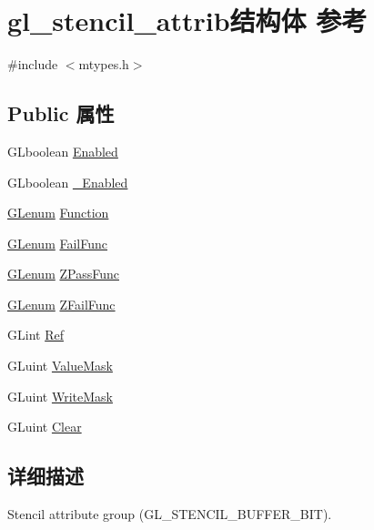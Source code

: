 \hypertarget{structgl__stencil__attrib}{}\section{gl\+\_\+stencil\+\_\+attrib结构体 参考}
\label{structgl__stencil__attrib}


{\ttfamily \#include $<$mtypes.\+h$>$}

\subsection*{Public 属性}
\begin{DoxyCompactItemize}
\item 
G\+Lboolean \hyperlink{structgl__stencil__attrib_a5dd4abe695c8a10181da2b6bcdc14c12}{Enabled}
\item 
G\+Lboolean \hyperlink{structgl__stencil__attrib_aecca45f45121ad46c4bfc823346023ef}{\+\_\+\+Enabled}
\item 
\hyperlink{interfacevoid}{G\+Lenum} \hyperlink{structgl__stencil__attrib_aceda6a4c70c49f4af82bd69c3b037469}{Function}
\item 
\hyperlink{interfacevoid}{G\+Lenum} \hyperlink{structgl__stencil__attrib_a856cbd9279513cc9ffb70d18ee5ecbf4}{Fail\+Func}
\item 
\hyperlink{interfacevoid}{G\+Lenum} \hyperlink{structgl__stencil__attrib_a8e61ca23b8efe111008199eb37bb39b4}{Z\+Pass\+Func}
\item 
\hyperlink{interfacevoid}{G\+Lenum} \hyperlink{structgl__stencil__attrib_aeca1304daecf78e3bc73266b90213ace}{Z\+Fail\+Func}
\item 
G\+Lint \hyperlink{structgl__stencil__attrib_aa1b555431ce8de3795f598fa318ab948}{Ref}
\item 
G\+Luint \hyperlink{structgl__stencil__attrib_a3dcb4134c28d67a86a40023b971f48b6}{Value\+Mask}
\item 
G\+Luint \hyperlink{structgl__stencil__attrib_a1d8e770dacbcb8c3bcc302413065ff34}{Write\+Mask}
\item 
G\+Luint \hyperlink{structgl__stencil__attrib_afec9916b90cdd432302632e3f8e8aa2b}{Clear}
\end{DoxyCompactItemize}


\subsection{详细描述}
Stencil attribute group (G\+L\+\_\+\+S\+T\+E\+N\+C\+I\+L\+\_\+\+B\+U\+F\+F\+E\+R\+\_\+\+B\+IT). 

